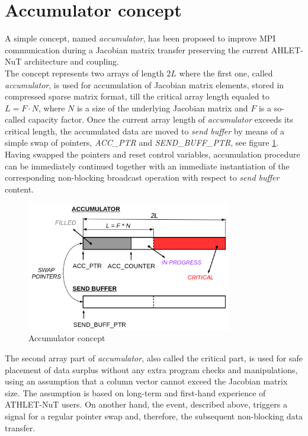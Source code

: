 \section{Accumulator concept}
\label{sec:accumulator-approach}



A simple concept, named \textit{accumulator}, has been proposed to improve MPI communication during a Jacobian matrix transfer preserving the current AHLET-NuT architecture and coupling.\\


The concept represents two arrays of length $2L$ where the first one, called \textit{accumulator}, is used for accumulation of Jacobian matrix elements, stored in compressed sparse matrix format, till the critical array length equaled to $L = F \cdot N$, where $N$ is a size of the underlying Jacobian matrix and $F$ is a so-called capacity factor. Once the current array length of \textit{accumulator} exceeds its critical length, the accumulated data are moved to \textit{send buffer} by means of a simple swap of pointers, \textit{ACC\_PTR} and \textit{SEND\_BUFF\_PTR}, see figure \ref{fig:accumulator-concept}. Having swapped the pointers and reset control variables, accumulation procedure can be immediately continued together with an immediate instantiation of the corresponding non-blocking broadcast operation with respect to \textit{send buffer} content.\\


\begin{figure}[htpb]
  \centering
  \includegraphics[width=0.8\textwidth]{figures/chapter-3/accumulator-concept.png}
  \caption{Accumulator concept} \label{fig:accumulator-concept}
\end{figure}


The second array part of \textit{accumulator}, also called the critical part, is used for safe placement of data surplus without any extra program checks and manipulations, using an assumption that a column vector cannot exceed the Jacobian matrix size. The assumption is based on long-term and first-hand experience of ATHLET-NuT users. On another hand, the event, described above, triggers a signal for a regular pointer swap and, therefore, the subsequent non-blocking data transfer.\\



